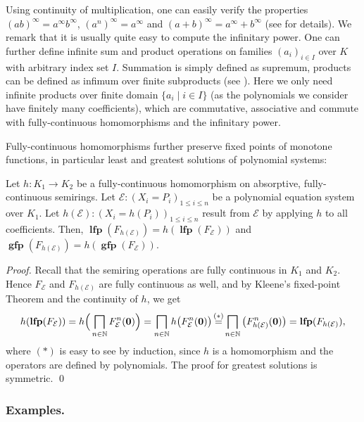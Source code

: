 \documentclass[english,runningheads,a4paper,envcountsame]{llncs}
\DeclareMathOperator{\lfp}{\mathbf{lfp}}
\DeclareMathOperator{\gfp}{\mathbf{gfp}}
\newcommand{\Inf}{\bigsqcap}
\newcommand{\NN}{\mathbb{N}}
\newcommand*{\EE}{\mathcal{E}}
\newcommand*{\co}{\colon}
\newcommand*{\tup}[1]{\mathbf{#1}}
\newcommand{\eqInfo}[1]{\overset{\clap{\scriptsize #1}}{=}}
\newcommand{\eqStar}{\eqInfo{$(*)$}}
\begin{document}
Using continuity of multiplication, one can easily verify the properties $(ab)^\infty = a^\infty b^\infty$, $(a^n)^\infty = a^\infty$ and $(a+b)^\infty = a^\infty + b^\infty$ (see \cite{DannertGraNaaTan19} for details).
We remark that it is usually quite easy to compute the infinitary power.
One can further define infinite sum and product operations on families $(a_i)_{i \in I}$ over $K$ with arbitrary index set $I$.
Summation is simply defined as supremum, products can be defined as infimum over finite subproducts (see \cite[Appendix]{DannertGraNaaTan19}).
Here we only need infinite products over finite domain $\{a_i \mid i \in I\}$ (as the polynomials we consider have finitely many coefficients), which are commutative, associative and commute with fully-continuous  homomorphisms and the infinitary power.

Fully-continuous homomorphisms further preserve fixed points of monotone functions, in particular least and greatest solutions of polynomial systems:

\begin{lemma}\label{lemHomoPreservesSolutions}
Let $h \co K_1 \to K_2$ be a fully-continuous homomorphism on absorptive, fully-continuous semirings.
Let $\EE \co (X_i = P_i)_{1 \le i \le n}$ be a polynomial equation system over $K_1$.
Let $h(\EE) \co (X_i = h(P_i))_{1 \le i \le n}$ result from $\EE$ by applying $h$ to all coefficients.
Then, $\lfp(F_{h(\EE)}) = h(\lfp(F_\EE))$ and $\gfp(F_{h(\EE)}) = h(\gfp(F_\EE))$.
\end{lemma}
\begin{proof}
Recall that the semiring operations are fully continuous in $K_1$ and $K_2$.
Hence $F_\EE$ and $F_{h(\EE)}$ are fully continuous as well, and by Kleene's fixed-point Theorem and the continuity of $h$, we get
\[
    h(\lfp(F_\EE)) =
    h\Big( \Inf_{n \in \NN} F_{\EE}^n(\tup 0) \Big) =
    \Inf_{n \in \NN} h\big(F_{\EE}^n(\tup 0) \big) \eqStar
    \Inf_{n \in \NN} \big(F_{h(\EE)}^n(\tup 0) \big) =
    \lfp(F_{h(\EE)}),
\]
where $(*)$ is easy to see by induction, since $h$ is a homomorphism and the operators are defined by polynomials. The proof for greatest solutions is symmetric.
\qed
\end{proof}



\subsubsection*{Examples.}
\end{document}

